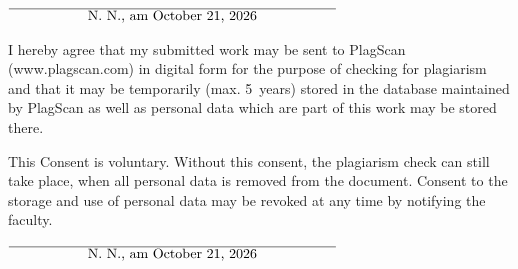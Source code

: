 \documentclass[12pt,oneside,a4paper,parskip]{scrbook}
\def\BaAuthor{Achim Winter}
\def\ShowBaAuthor{\BaAuthor}
\def\ShowBaAuthor{N.~N.}
\begin{document}
\vspace{20pt}
\begin{flushright}
$\overline{~~~~~~~~~~~~~~~~~\mbox{\ShowBaAuthor, am \today}~~~~~~~~~~~~~~~~~}$
\end{flushright}


I hereby agree that my submitted work may be sent to PlagScan (www.plagscan.com) in digital form for the purpose of checking for plagiarism and that it may be temporarily (max. 5~years) stored in the database maintained by PlagScan as well as personal data which are part of this work may be stored there.

\begin{small}
This Consent is voluntary. Without this consent, the plagiarism check can still take place, when all personal data is removed from the document. Consent to the storage and use of personal data may be revoked at any time by notifying the faculty.
\end{small}

\vspace{20pt}
\begin{flushright}
$\overline{~~~~~~~~~~~~~~~~~\mbox{\ShowBaAuthor, am \today}~~~~~~~~~~~~~~~~~}$
\end{flushright}
\end{document}
